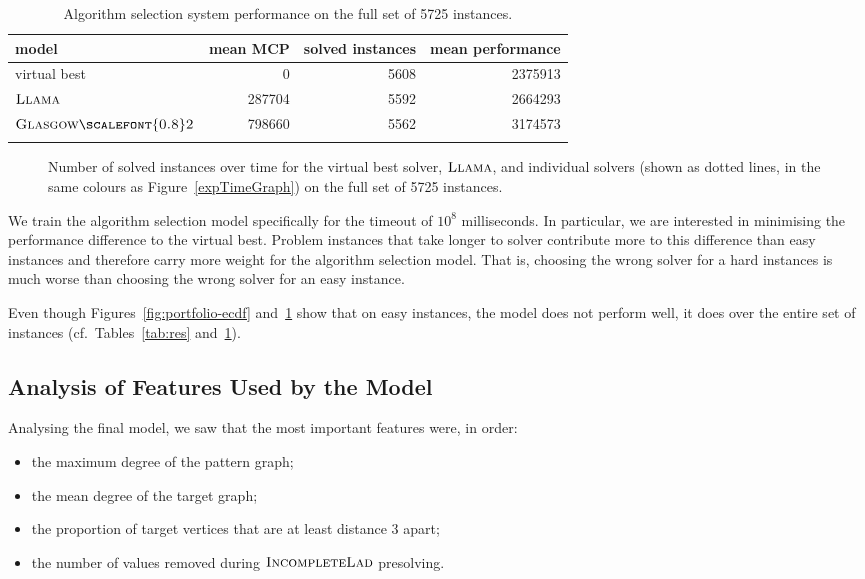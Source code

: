 \documentclass{llncs}
\newcommand{\IncompleteLAD}{$\textsc{IncompleteLad}$\xspace}
\newcommand{\GlasgowTwo}{$\textsc{Glasgow{\scalefont{0.8}2}}$\xspace}
\newcommand{\LLAMA}{$\textsc{Llama}$\xspace}
\begin{document}
\begin{table}[p]
    \centering\setlength{\tabcolsep}{1em}
\begin{tabular}{lrrr}
  \toprule
model & mean MCP & solved instances & mean performance\\
  \midrule
virtual best & 0 & 5608 & 2375913\\
\LLAMA & 287704 & 5592 & 2664293\\
\GlasgowTwo & 798660 & 5562 & 3174573\\
   \bottomrule \\
\end{tabular}
\caption{Algorithm selection system performance on the full set of 5725
instances.}\label{tab:resfull}
\end{table}

\begin{figure}[p]
    
\caption{Number of solved instances over time for the virtual best
solver, \LLAMA, and individual solvers (shown as dotted lines, in the same
colours as Figure~\ref{expTimeGraph}) on the full set of 5725 instances.}
\label{fig:portfolio-ecdf-full}
\end{figure}

We train the algorithm selection model specifically for the timeout of $10^8$
milliseconds. In particular, we are interested in minimising the performance
difference to the virtual best. Problem instances that take longer to solver
contribute more to this difference than easy instances and therefore carry more
weight for the algorithm selection model. That is, choosing the wrong solver for
a hard instances is much worse than choosing the wrong solver for an easy
instance.

Even though Figures~\ref{fig:portfolio-ecdf} and~\ref{fig:portfolio-ecdf-full}
show that on easy instances, the model does not perform well, it does over
the entire set of instances (cf.\ Tables~\ref{tab:res} and~\ref{tab:resfull}).

\subsection{Analysis of Features Used by the Model}

Analysing the final model, we saw that the most important features were, in order:

\begin{itemize}
    \item the maximum degree of the pattern graph;
    \item the mean degree of the target graph;
    \item the proportion of target vertices that are at least distance 3
        apart;
    \item the number of values removed during \IncompleteLAD presolving.
\end{itemize}
\end{document}

